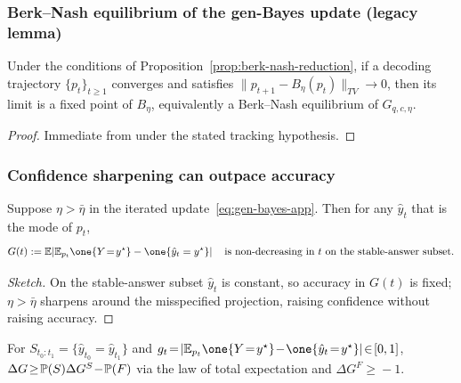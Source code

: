 \subsubsection{Berk--Nash equilibrium of the gen-Bayes update (legacy lemma)}
\label{app:thm3-berk-nash}

\begin{lemma}
\label{lem:berk-nash}
Under the conditions of Proposition~\ref{prop:berk-nash-reduction},
if a decoding trajectory $\{p_t\}_{t\geq 1}$ converges and satisfies
$\|p_{t+1}-B_\eta(p_t)\|_{TV}\to 0$, then its limit is a fixed point of
$B_\eta$, equivalently a Berk--Nash equilibrium of $G_{q,c,\eta}$.
\end{lemma}

\begin{proof}
Immediate from  under the stated tracking
hypothesis.
\end{proof}

\subsubsection{Confidence sharpening can outpace accuracy}
\label{app:thm3-sharpening}

\begin{lemma}
\label{lem:eta-overshoot}
Suppose $\eta>\bar\eta$ in the iterated update~\eqref{eq:gen-bayes-app}.
Then for any $\hat y_t$ that is the mode of $p_t$,
\begin{equation}
G(t):=\E\!\left|\E_{p_t}\one{Y\!=\!y^\star}-\one{\hat y_t = y^\star}\right|
\quad\textup{is non-decreasing in $t$ on the stable-answer subset.}
\nonumber
\end{equation}
\end{lemma}

\begin{proof}[Sketch]
On the stable-answer subset $\hat y_t$ is constant, so accuracy in
$G(t)$ is fixed; $\eta\!>\!\bar\eta$ sharpens around the
misspecified projection, raising confidence without raising
accuracy.
\end{proof}

\begin{proposition}
\label{prop:t3-decomposition}
For $S_{t_0:t_1}\!=\!\{\hat y_{t_0}\!=\!\hat y_{t_1}\}$ and
$g_t\!=\!|\E_{p_t}\one{Y\!=\!y^\star}\!-\!\one{\hat y_t\!=\!y^\star}|\!\in\![0,1]$,
$\Delta G\!\ge\!\mathbb{P}(S)\Delta G^S\!-\!\mathbb{P}(F)$ via the law of total
expectation and $\Delta G^F\!\ge\!-1$.
\end{proposition}

